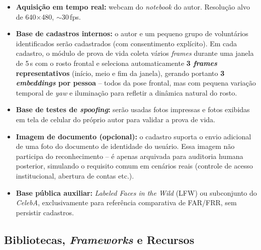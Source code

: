 \documentclass[12pt,a4paper]{article}
\begin{document}
\begin{itemize}[leftmargin=*]
    \item \textbf{Aquisi\c{c}\~ao em tempo real:} webcam do \emph{notebook} do autor.
    Resolu\c{c}\~ao alvo de 640$\times$480, $\sim$30\,fps.

    \item \textbf{Base de cadastros internos:} o autor e um pequeno grupo de
    volunt\'arios identificados ser\~ao cadastrados (com consentimento expl\'icito).
    Em cada cadastro, o m\'odulo de prova de vida coleta v\'arios \emph{frames}
    durante uma janela de 5\,s com o rosto frontal e seleciona automaticamente
    \textbf{3 \emph{frames} representativos} (in\'icio, meio e fim da janela), gerando
    portanto \textbf{3 \emph{embeddings} por pessoa} -- todos da pose frontal, mas com
    pequena varia\c{c}\~ao temporal de \emph{yaw} e ilumina\c{c}\~ao para refletir
    a din\^amica natural do rosto.

    \item \textbf{Base de testes de \emph{spoofing}:} ser\~ao usadas fotos impressas e fotos
    exibidas em tela de celular do pr\'oprio autor para validar a prova de vida.

    \item \textbf{Imagem de documento (opcional):} o cadastro suporta o envio adicional
    de uma foto do documento de identidade do usu\'ario. Essa imagem n\~ao participa
    do reconhecimento -- \'e apenas arquivada para auditoria humana posterior, simulando
    o requisito comum em cen\'arios reais (controle de acesso institucional,
    abertura de contas etc.).

    \item \textbf{Base p\'ublica auxiliar:} \emph{Labeled Faces in the Wild} (LFW) ou subconjunto
    do \emph{CelebA}, exclusivamente para refer\^encia comparativa de FAR/FRR, sem persistir
    cadastros.
\end{itemize}

\subsection{Bibliotecas, \emph{Frameworks} e Recursos}
\end{document}
